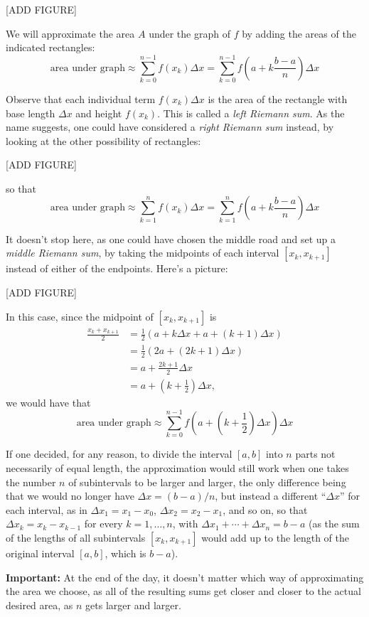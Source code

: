 \documentclass[nooutcomes]{ximera}
\begin{document}
[ADD FIGURE]

We will approximate the area $A$ under the graph of $f$ by adding the areas of the indicated rectangles: $$\mbox{area under graph} \approx \sum_{k=0}^{n-1} f(x_k)\Delta x = \sum_{k=0}^{n-1} f\left(a+k\frac{b-a}{n}\right) \Delta x $$

Observe that each individual term $f(x_k)\Delta x$ is the area of the rectangle with base length $\Delta x$ and height $f(x_k)$. This is called a \emph{left Riemann sum}. As the name suggests, one could have considered a \emph{right Riemann sum} instead, by looking at the other possibility of rectangles:

[ADD FIGURE]

so that $$\mbox{area under graph} \approx \sum_{k=1}^n f(x_k)\Delta x = \sum_{k=1}^n f\left(a+k\frac{b-a}{n}\right) \Delta x$$

It doesn't stop here, as one could have chosen the middle road and set up a \emph{middle Riemann sum}, by taking the midpoints of each interval $[x_k,x_{k+1}]$ instead of either of the endpoints. Here's a picture:

[ADD FIGURE]

In this case, since the midpoint of $[x_k,x_{k+1}]$ is \begin{align*}\frac{x_k+x_{k+1}}{2} &= \frac{1}{2}(a+k \Delta x + a + (k+1)\Delta x) \\ &= \frac{1}{2}(2a+(2k+1)\Delta x) \\ &= a+ \frac{2k+1}{2}\Delta x \\ &= a + \left(k+\frac{1}{2}\right)\Delta x,\end{align*}we would have that $$\mbox{area under graph} \approx \sum_{k=0}^{n-1} f\left(a + \left(k+\frac{1}{2}\right)\Delta x\right) \Delta x$$

If one decided, for any reason, to divide the interval $[a,b]$ into $n$ parts not necessarily of equal length, the approximation would still work when one takes the number $n$ of subintervals to be larger and larger, the only difference being that we would no longer have $\Delta x = (b-a)/n$, but instead a different ``$\Delta x$'' for each interval, as in $\Delta x_1 = x_1-x_0$, $\Delta x_2= x_2-x_1$, and so on, so that $\Delta x_k = x_k-x_{k-1}$ for every $k=1,\ldots, n$, with $\Delta x_1+\cdots + \Delta x_n = b-a$ (as the sum of the lengths of all subintervals $[x_k,x_{k+1}]$ would add up to the length of the original interval $[a,b]$, which is $b-a$).

\begin{callout}
 {\bf Important:} At the end of the day, it doesn't matter which way of approximating the area we choose, as all of the resulting sums get closer and closer to the actual desired area, as $n$ gets larger and larger.  
\end{callout}
\end{document}
